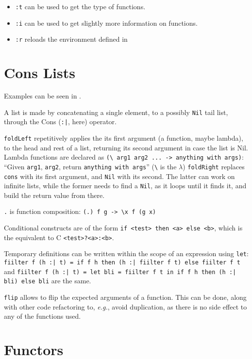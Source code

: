 \documentclass[a4paper]{article}
\newcommand{\latinlocution}[1]{\textit{#1}}
\newcommand{\eg}{\latinlocution{e.g.}}
\begin{document}
\begin{itemize}
  \item \verb_:t_ can be used to get the type of functions.
  \item \verb_:i_ can be used to get slightly more information on functions.
  \item \verb_:r_ reloads the environment defined in 
\end{itemize}

\section{Cons Lists}

Examples can be seen in .

A list is made by concatenating a single element, to a possibly \verb_Nil_ tail
list, through the Cons (\verb_:|_, here) operator.

\verb_foldLeft_ repetitively applies the its first argument (a function, maybe
lambda), to the head and rest of a list, returning its second argument in case
the list is Nil. Lambda functions are declared as
%
\verb_(\ arg1 arg2 ... -> anything with args)_:
%
``Given \verb_arg1_, \verb_arg2_, return \verb_anything with args_'' (\verb_\_
is the $\lambda$) \verb_foldRight_ replaces \verb_cons_ with its first argument,
and \verb_Nil_ with its second. The latter can work on infinite lists, while the
former needs to find a \verb_Nil_, as it loops until it finds it, and build the
return value from there.

\verb_._ is function composition: \verb_(.) f g -> \x f (g x)_

Conditional constructs are of the form \verb_if <test> then <a> else <b>_, which
is the equivalent to C \verb_<test>?<a>:<b>_.

Temporary definitions can be written within the scope of an expression using
\verb_let_:
%
\verb_fiilter f (h :| t) = if f h then (h :| fiilter f t) else fiilter f t_ and
%
\verb_fiilter f (h :| t) = let bli = fiilter f t in if f h then (h :| bli) else bli_
are the same.

\verb_flip_ allows to flip the expected arguments of a function. This can be
done, along with other code refactoring to, \eg, avoid duplication, as there is
no side effect to any of the functions used.


\section{Functors}
\end{document}
